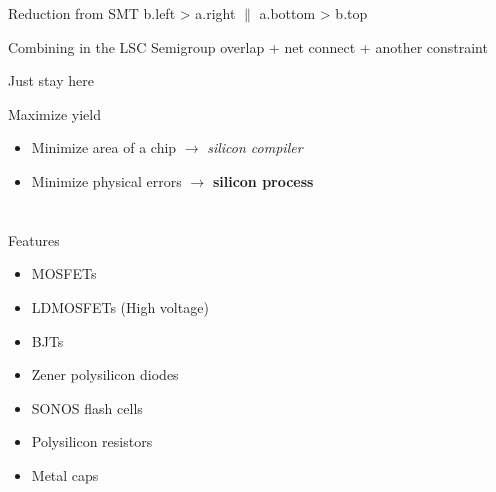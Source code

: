 \documentclass[9pt]{beamer}
\begin{document}
\begin{frame}{Reduction from SMT}
        b.left > a.right
    $\parallel$ a.bottom > b.top
\end{frame}

\begin{frame}{Combining in the LSC Semigroup}
    overlap + net connect + another constraint
\end{frame}

\begin{frame}{Just stay here}
\end{frame}

\begin{frame}{Maximize yield}
	\begin{itemize}
        \setlength\itemsep{1em}
		\item Minimize area of a chip $\rightarrow$ \textit{silicon compiler}
		\item Minimize physical errors $\rightarrow$ \textbf{silicon process}
	\end{itemize}
\end{frame}


\section[Process]{}

\begin{frame}{Features}
	\begin{itemize}
        \setlength\itemsep{1em}
		\item MOSFETs
		\item LDMOSFETs (High voltage) 
		\item BJTs
		\item Zener polysilicon diodes
		\item SONOS flash cells
		\item Polysilicon resistors
		\item Metal caps
	\end{itemize}
\end{frame}
\end{document}
